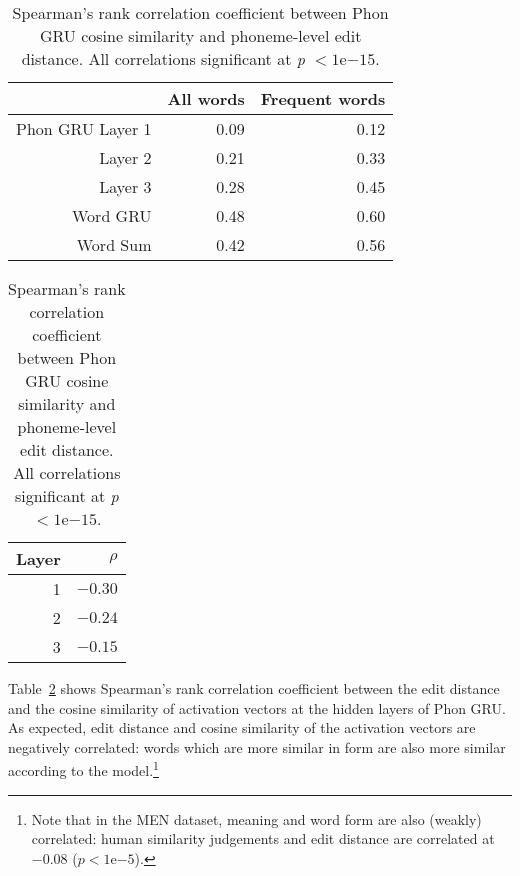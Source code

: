 \begin{table}[h]
    \begin{minipage}[l]{0.55\textwidth}
      \centering
      \begin{tabular}{rrr}
        & All words & Frequent words \\\hline
        {\sc Phon GRU} Layer 1 & 0.09 & 0.12\\
        Layer 2 & 0.21 & 0.33 \\
        Layer 3 & 0.28 & 0.45 \\
        \hline
        {\sc Word GRU} & 0.48 & 0.60\\	\hline
        {\sc Word Sum} & 0.42 & 0.56
      \end{tabular}
      \caption{Spearman's correlation coefficient between word-word
        cosine similarity and human similarity judgements. All
        correlations significant at \textit{p} $< 1\mathrm{e}{-4}$.
        Frequent words appear at least 100 times in the training
        data.}
      \label{tab:human}
    \end{minipage}
    \hspace{0.5cm}
    \begin{minipage}[r]{0.4\textwidth}
      \centering
      \begin{tabular}{rr}
        Layer   & $\rho$ \\\hline
        1 & $-0.30$ \\
        2 & $-0.24$ \\
        3 & $-0.15$
      \end{tabular}
      \caption{Spearman's rank correlation coefficient between {\sc
          Phon GRU} cosine similarity and phoneme-level edit
        distance. All correlations significant at \textit{p}
        $< 1\mathrm{e}{-15}$.}
      \label{tab:edit}
    \end{minipage}

\end{table}

Table~\ref{tab:edit} shows Spearman's rank correlation coefficient between the edit distance and the cosine similarity of activation vectors at the hidden layers of {\sc Phon GRU}.
As expected, edit distance and cosine similarity of the activation vectors are negatively correlated: words which are more similar in form are also more similar according to the model.\footnote{Note that in the MEN dataset, meaning and word form are also (weakly) correlated: human similarity judgements and edit distance are correlated at $-0.08$ ($p< 1\mathrm{e}{-5}$).}

